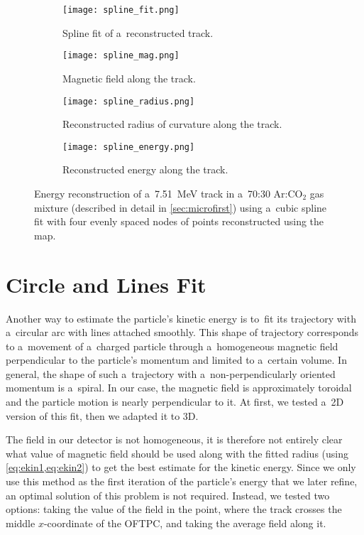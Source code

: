 		\begin{figure}
			\centering
			\begin{subfigure}[t]{0.48\textwidth}
				\centering
				\texttt{[image: spline\_fit.png]}
				\caption{Spline fit of a~reconstructed track.}
			\end{subfigure}
			\hfill
			\begin{subfigure}[t]{0.48\textwidth}
				\centering
				\texttt{[image: spline\_mag.png]}
				\caption{Magnetic field along the track.}
			\end{subfigure}
			\begin{subfigure}[t]{0.48\textwidth}
				\centering
				\texttt{[image: spline\_radius.png]}
				\caption{Reconstructed radius of curvature along the track.}
			\end{subfigure}
			\hfill
			\begin{subfigure}[t]{0.48\textwidth}
				\centering
				\texttt{[image: spline\_energy.png]}
				\caption{Reconstructed energy along the track.}
			\end{subfigure}
			\caption{Energy reconstruction of a~\qty{7.51}{\MeV} track in a~70:30 Ar:CO$_2$ gas mixture (described in detail in \cref{sec:microfirst}) using a~cubic spline fit with four evenly spaced nodes of points reconstructed using the map.}
			\label{fig:spline}
		\end{figure}
	
	\section{Circle and Lines Fit}
	\label{sec:clines}
		Another way to estimate the particle's kinetic energy is to~fit its trajectory with a~circular arc with lines attached smoothly. This shape of trajectory corresponds to a~movement of a~charged particle through a~homogeneous magnetic field perpendicular to the particle's momentum and limited to a~certain volume. In general, the shape of such a~trajectory with a~non-perpendicularly oriented momentum is a~spiral. In our case, the magnetic field is approximately toroidal and the particle motion is nearly perpendicular to it. At first, we tested a~2D version of this fit, then we adapted it to 3D.
		
		The field in our detector is not homogeneous, it is therefore not entirely clear what value of magnetic field should be used along with the fitted radius (using \cref{eq:ekin1,eq:ekin2}) to get the best estimate for the kinetic energy. Since we only use this method as the first iteration of the particle's energy that we later refine, an optimal solution of this problem is not required. Instead, we tested two options: taking the value of the field in the point, where the track crosses the middle $x$\nobreakdash-coordinate of the \ac{OFTPC}, and taking the average field along it.
		
